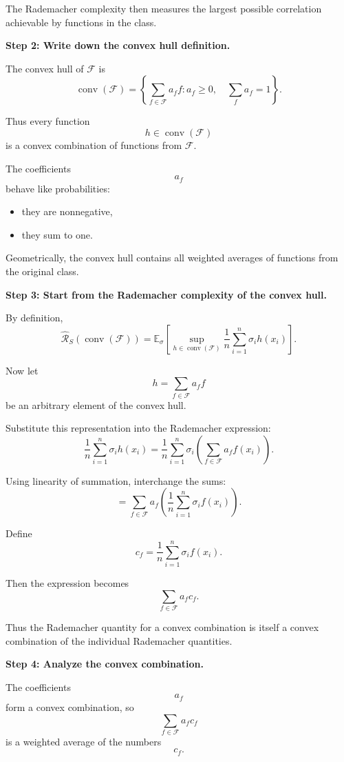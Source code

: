 \documentclass[11pt]{article}
\newcommand{\E}{\mathbb{E}}
\begin{document}
\begin{enumerate}
\begin{solutionbox}
The Rademacher complexity then measures the largest possible correlation achievable by functions in the class.

\medskip

\textbf{Step 2: Write down the convex hull definition.}

The convex hull of $\mathcal F$ is
\[
\operatorname{conv}(\mathcal F)
=
\left\{
\sum_{f\in\mathcal F}a_ff
:
a_f\ge0,
\quad
\sum_fa_f=1
\right\}.
\]

Thus every function
\[
h\in\operatorname{conv}(\mathcal F)
\]
is a convex combination of functions from $\mathcal F$.

The coefficients
\[
a_f
\]
behave like probabilities:
\begin{itemize}
    \item they are nonnegative,
    \item they sum to one.
\end{itemize}

Geometrically, the convex hull contains all weighted averages of functions from the original class.

\medskip

\textbf{Step 3: Start from the Rademacher complexity of the convex hull.}

By definition,
\[
\widehat{\mathcal R}_S(\operatorname{conv}(\mathcal F))
=
\E_\sigma
\left[
\sup_{h\in\operatorname{conv}(\mathcal F)}
\frac1n
\sum_{i=1}^n
\sigma_ih(x_i)
\right].
\]

Now let
\[
h=\sum_{f\in\mathcal F}a_ff
\]
be an arbitrary element of the convex hull.

Substitute this representation into the Rademacher expression:
\[
\frac1n
\sum_{i=1}^n
\sigma_ih(x_i)
=
\frac1n
\sum_{i=1}^n
\sigma_i
\left(
\sum_{f\in\mathcal F}a_ff(x_i)
\right).
\]

Using linearity of summation, interchange the sums:
\[
=
\sum_{f\in\mathcal F}
a_f
\left(
\frac1n
\sum_{i=1}^n
\sigma_if(x_i)
\right).
\]

Define
\[
c_f
=
\frac1n
\sum_{i=1}^n
\sigma_if(x_i).
\]

Then the expression becomes
\[
\sum_{f\in\mathcal F}a_fc_f.
\]

Thus the Rademacher quantity for a convex combination is itself a convex combination of the individual Rademacher quantities.

\medskip

\textbf{Step 4: Analyze the convex combination.}

The coefficients
\[
a_f
\]
form a convex combination, so
\[
\sum_{f\in\mathcal F}a_fc_f
\]
is a weighted average of the numbers
\[
c_f.
\]


\end{solutionbox}
\end{enumerate}
\end{document}
